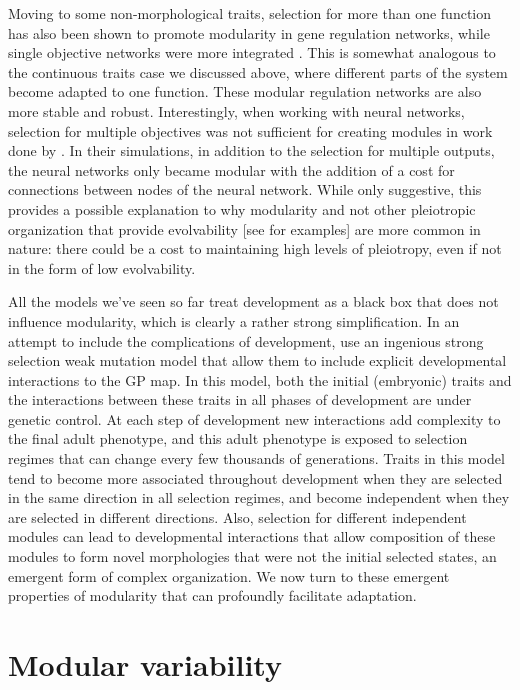 \begin{refsection}
Moving to some non-morphological traits, selection for more than one
function has also been shown to promote modularity in gene regulation
networks, while single objective networks were more integrated
\parencite{Espinosa-Soto2010-tw}. This is somewhat analogous to the
continuous traits case we discussed above, where different parts of the
system become adapted to one function. These modular regulation networks
are also more stable and robust. Interestingly, when working with neural
networks, selection for multiple objectives was not sufficient for
creating modules in work done by \textcite{Clune2012-ha}. In their simulations, in
addition to the selection for multiple outputs, the neural networks only
became modular with the addition of a cost for connections between nodes
of the neural network. While only suggestive, this provides a possible
explanation to why modularity and not other pleiotropic organization
that provide evolvability {[}see \textcite{Pavlicev2011-xm} for examples{]} are
more common in nature: there could be a cost to maintaining high levels
of pleiotropy, even if not in the form of low evolvability.

All the models we've seen so far treat development as a black box that
does not influence modularity, which is clearly a rather strong
simplification. In an attempt to include the complications of
development, \textcite{Watson2014-pi} use an ingenious strong selection weak
mutation model that allow them to include explicit developmental
interactions to the GP map. In this model, both the initial (embryonic)
traits and the interactions between these traits in all phases of
development are under genetic control. At each step of development new
interactions add complexity to the final adult phenotype, and this adult
phenotype is exposed to selection regimes that can change every few
thousands of generations. Traits in this model tend to become more
associated throughout development when they are selected in the same
direction in all selection regimes, and become independent when they are
selected in different directions. Also, selection for different
independent modules can lead to developmental interactions that allow
composition of these modules to form novel morphologies that were not
the initial selected states, an emergent form of complex organization.
We now turn to these emergent properties of modularity that can
profoundly facilitate adaptation.

\section{Modular variability}


\end{refsection}
